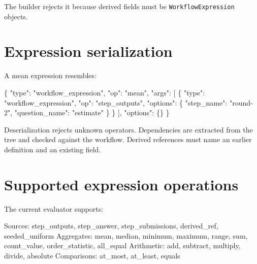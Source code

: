 \documentclass[
  10pt,
]{report}
\newenvironment{Shaded}{}{}
\newcommand{\DataTypeTok}[1]{\textcolor[rgb]{0.56,0.13,0.00}{#1}}
\newcommand{\FunctionTok}[1]{\textcolor[rgb]{0.02,0.16,0.49}{#1}}
\newcommand{\NormalTok}[1]{#1}
\newcommand{\OtherTok}[1]{\textcolor[rgb]{0.00,0.44,0.13}{#1}}
\newcommand{\StringTok}[1]{\textcolor[rgb]{0.25,0.44,0.63}{#1}}
\begin{document}
The builder rejects it because derived fields must be
\texttt{WorkflowExpression} objects.

\section{Expression serialization}\label{expression-serialization}

A mean expression resembles:

\begin{Shaded}
\begin{Highlighting}[]
\FunctionTok{\{}
  \DataTypeTok{"type"}\FunctionTok{:} \StringTok{"workflow\_expression"}\FunctionTok{,}
  \DataTypeTok{"op"}\FunctionTok{:} \StringTok{"mean"}\FunctionTok{,}
  \DataTypeTok{"args"}\FunctionTok{:} \OtherTok{[}
    \FunctionTok{\{}
      \DataTypeTok{"type"}\FunctionTok{:} \StringTok{"workflow\_expression"}\FunctionTok{,}
      \DataTypeTok{"op"}\FunctionTok{:} \StringTok{"step\_outputs"}\FunctionTok{,}
      \DataTypeTok{"options"}\FunctionTok{:} \FunctionTok{\{}
        \DataTypeTok{"step\_name"}\FunctionTok{:} \StringTok{"round{-}2"}\FunctionTok{,}
        \DataTypeTok{"question\_name"}\FunctionTok{:} \StringTok{"estimate"}
      \FunctionTok{\}}
    \FunctionTok{\}}
  \OtherTok{]}\FunctionTok{,}
  \DataTypeTok{"options"}\FunctionTok{:} \FunctionTok{\{\}}
\FunctionTok{\}}
\end{Highlighting}
\end{Shaded}

Deserialization rejects unknown operators. Dependencies are extracted
from the tree and checked against the workflow. Derived references must
name an earlier definition and an existing field.

\section{Supported expression
operations}\label{supported-expression-operations}

The current evaluator supports:

\begin{Shaded}
\begin{Highlighting}[]
\NormalTok{Sources:      step\_outputs, step\_answer, step\_submissions, derived\_ref,}
\NormalTok{              seeded\_uniform}
\NormalTok{Aggregates:   mean, median, minimum, maximum, range, sum, count\_value,}
\NormalTok{              order\_statistic, all\_equal}
\NormalTok{Arithmetic:   add, subtract, multiply, divide, absolute}
\NormalTok{Comparisons:  at\_most, at\_least, equals}
\end{Highlighting}
\end{Shaded}
\end{document}

